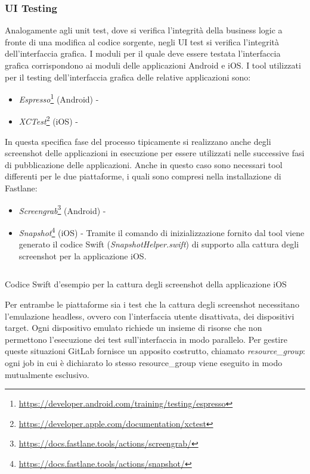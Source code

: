 \subsubsection{UI Testing}
Analogamente agli unit test, dove si verifica l'integrità della business logic a fronte di una modifica al codice sorgente, negli UI test si verifica l'integrità dell'interfaccia grafica. I moduli per il quale deve essere testata l'interfaccia grafica corrispondono ai moduli delle applicazioni Android e iOS. I tool utilizzati per il testing dell'interfaccia grafica delle relative applicazioni sono:
\begin{itemize}
    \item \textit{Espresso}\footnote{\url{https://developer.android.com/training/testing/espresso}} (Android) -
    \item \textit{XCTest}\footnote{\url{https://developer.apple.com/documentation/xctest}} (iOS) - 
\end{itemize}
In questa specifica fase del processo tipicamente si realizzano anche degli screenshot delle applicazioni in esecuzione per essere utilizzati nelle successive fasi di pubblicazione delle applicazioni. Anche in questo caso sono necessari tool differenti per le due piattaforme, i quali sono compresi nella installazione di Fastlane:
\begin{itemize}
    \item \textit{Screengrab}\footnote{\url{https://docs.fastlane.tools/actions/screengrab/}} (Android) -
    \item \textit{Snapshot}\footnote{\url{https://docs.fastlane.tools/actions/snapshot/}} (iOS) - Tramite il comando di inizializzazione fornito dal tool viene generato il codice Swift (\textit{SnapshotHelper.swift}) di supporto alla cattura degli screenshot per la applicazione iOS.
\end{itemize}

\begin{listing}[H]
\inputminted{swift}{code/4-ios-screenshot}
\caption{Codice Swift d'esempio per la cattura degli screenshot della applicazione iOS}
\end{listing}

Per entrambe le piattaforme sia i test che la cattura degli screenshot necessitano l'emulazione headless, ovvero con l'interfaccia utente disattivata, dei dispositivi target. Ogni dispositivo emulato richiede un insieme di risorse che non permettono l'esecuzione dei test sull'interfaccia in modo parallelo. Per gestire queste situazioni GitLab fornisce un apposito costrutto, chiamato \textit{resource\_group}: ogni job in cui è dichiarato lo stesso resource\_group viene eseguito in modo mutualmente esclusivo.

